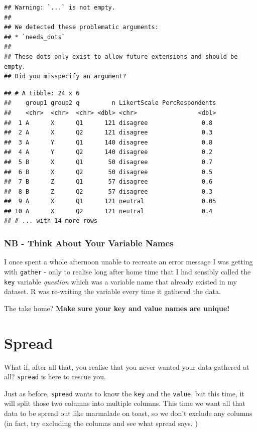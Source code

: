 \documentclass[
]{book}
\begin{document}
\begin{verbatim}
## Warning: `...` is not empty.
## 
## We detected these problematic arguments:
## * `needs_dots`
## 
## These dots only exist to allow future extensions and should be empty.
## Did you misspecify an argument?
\end{verbatim}

\begin{verbatim}
## # A tibble: 24 x 6
##    group1 group2 q         n LikertScale PercRespondents
##    <chr>  <chr>  <chr> <dbl> <chr>                 <dbl>
##  1 A      X      Q1      121 disagree               0.8 
##  2 A      X      Q2      121 disagree               0.3 
##  3 A      Y      Q1      140 disagree               0.8 
##  4 A      Y      Q2      140 disagree               0.2 
##  5 B      X      Q1       50 disagree               0.7 
##  6 B      X      Q2       50 disagree               0.5 
##  7 B      Z      Q1       57 disagree               0.6 
##  8 B      Z      Q2       57 disagree               0.3 
##  9 A      X      Q1      121 neutral                0.05
## 10 A      X      Q2      121 neutral                0.4 
## # ... with 14 more rows
\end{verbatim}

\hypertarget{nb---think-about-your-variable-names}{%
\subsubsection{NB - Think About Your Variable Names}\label{nb---think-about-your-variable-names}}

I once spent a whole afternoon unable to recreate an error message I was getting with \texttt{gather} - only to realise long after home time that I had sensibly called the \texttt{key} variable \emph{question} which was a variable name that already existed in my dataset. R was re-writing the variable every time it gathered the data.

The take home? \textbf{Make sure your key and value names are unique!}

\hypertarget{spread}{%
\section{Spread}\label{spread}}

What if, after all that, you realise that you never wanted your data gathered at all? \texttt{spread} is here to rescue you.

Just as before, \texttt{spread} wants to know the \texttt{key} and the \texttt{value}, but this time, it will split those two columns into multiple columns. This time we want all that data to be spread out like marmalade on toast, so we don't exclude any columns (in fact, try excluding the columns and see what spread says. )
\end{document}
